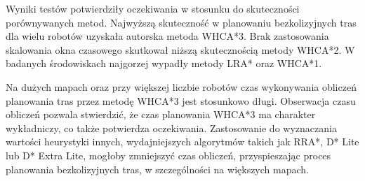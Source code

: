 Wyniki testów potwierdziły oczekiwania w stosunku do skuteczności porównywanych metod.
Najwyższą skuteczność w planowaniu bezkolizyjnych tras dla wielu robotów uzyskała autorska metoda WHCA*3.
Brak zastosowania skalowania okna czasowego skutkował niższą skutecznością metody WHCA*2.
W badanych środowiskach najgorzej wypadły metody LRA* oraz WHCA*1.


Na dużych mapach oraz przy większej liczbie robotów czas wykonywania obliczeń planowania tras przez metodę WHCA*3 jest stosunkowo długi.
Obserwacja czasu obliczeń pozwala stwierdzić, że czas planowania WHCA*3 ma charakter wykładniczy, co także potwierdza oczekiwania.
Zastosowanie do wyznaczania wartości heurystyki innych, wydajniejszych algorytmów takich jak RRA*, D* Lite lub D* Extra Lite, mogłoby zmniejszyć czas obliczeń, przyspieszając proces planowania bezkolizyjnych tras, w szczególności na większych mapach.


